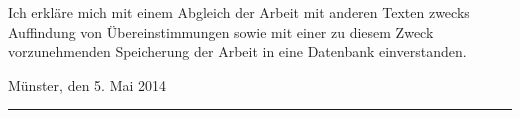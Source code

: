 \documentclass[paper=a4,
               fontsize=11pt,
               bibliography=totoc,
               listof=nochaptergap,
               listof=notoc,
               numbers=noendperiod,
               parskip=half,
               footnotes=multiple,
               toc=numberline,
               captions=tableheading,
               DIV=10,
              ]{scrreprt}
\begin{document}
  Ich erkläre mich mit einem Abgleich der Arbeit mit anderen Texten zwecks Auffindung von Übereinstimmungen sowie mit einer zu diesem Zweck vorzunehmenden Speicherung der Arbeit in eine Datenbank einverstanden.

  \begin{flushright}
    Münster, den 5. Mai 2014\hspace{.6cm}\rule{6cm}{.5pt}
  \end{flushright}
\end{document}
